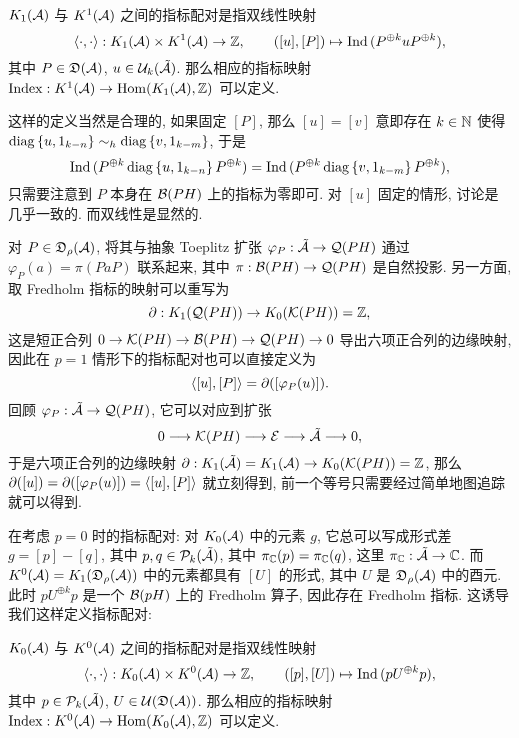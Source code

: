 \begin{Definition}[$ p=1 $ 的指标配对]
	$ K_1(\mathcal{A}) $ 与 $ K^1(\mathcal{A}) $ 之间的指标配对是指双线性映射
	\[
		\left\langle \cdot,\cdot \right\rangle : K_1(\mathcal{A})\times K^1(\mathcal{A})\to\mathbb{Z},\qquad ([u],[P])\mapsto\mathrm{Ind}\,(P^{\oplus k}uP^{\oplus k}),
	\]
	其中 $ P\in\mathfrak{D}(\mathcal{A}) $, $ u\in\mathcal{U}_k(\tilde{\mathcal{A}}) $. 那么相应的指标映射 $ \mathrm{Index} : K^1(\mathcal{A})\to\mathrm{Hom}(K_1(\mathcal{A}),\mathbb{Z}) $ 可以定义.
\end{Definition}

这样的定义当然是合理的, 如果固定 $ [P] $, 那么 $ [u]=[v] $ 意即存在 $ k\in\mathbb{N} $ 使得 $ \operatorname{diag}\left\{ u,1_{k-n} \right\}\sim_h\operatorname{diag}\left\{ v,1_{k-m} \right\} $, 于是
\[
	\mathrm{Ind}\,(P^{\oplus k}\operatorname{diag}\left\{ u,1_{k-n} \right\}P^{\oplus k})=\mathrm{Ind}\,(P^{\oplus k}\operatorname{diag}\left\{ v,1_{k-m} \right\}P^{\oplus k}),
\]
只需要注意到 $ P $ 本身在 $ \mathcal{B}(PH) $ 上的指标为零即可. 对 $ [u] $ 固定的情形, 讨论是几乎一致的. 而双线性是显然的.

对 $ P\in\mathfrak{D}_\rho(\mathcal{A}) $, 将其与抽象 Toeplitz 扩张 $ \varphi_P : \tilde{\mathcal{A}}\to\mathcal{Q}(PH) $ 通过 $ \varphi_P(a)=\pi(PaP) $ 联系起来, 其中 $ \pi : \mathcal{B}(PH)\to\mathcal{Q}(PH) $ 是自然投影. 另一方面, 取 Fredholm 指标的映射可以重写为
\[
	\partial : K_1(\mathcal{Q}(PH))\to K_0(\mathcal{K}(PH))=\mathbb{Z},
\]
这是短正合列 $ 0\to\mathcal{K}(PH)\to\mathcal{B}(PH)\to\mathcal{Q}(PH)\to 0 $ 导出六项正合列的边缘映射, 因此在 $ p=1 $ 情形下的指标配对也可以直接定义为
\[
	\left\langle [u],[P] \right\rangle=\partial([\varphi_P(u)]).
\]
回顾 $ \varphi_P : \tilde{\mathcal{A}}\to\mathcal{Q}(PH) $, 它可以对应到扩张
\[
	0\longrightarrow \mathcal{K}(PH)\longrightarrow\mathcal{E}\longrightarrow\tilde{\mathcal{A}}\longrightarrow 0,
\]
于是六项正合列的边缘映射 $ \partial : K_1(\tilde{\mathcal{A}})=K_1(\mathcal{A})\to K_0(\mathcal{K}(PH))=\mathbb{Z} $, 那么 $ \partial([u])=\partial([\varphi_P(u)])=\left\langle [u],[P] \right\rangle $ 就立刻得到, 前一个等号只需要经过简单地图追踪就可以得到.

在考虑 $ p=0 $ 时的指标配对: 对 $ K_0(\mathcal{A}) $ 中的元素 $ g $, 它总可以写成形式差 $ g=[p]-[q] $, 其中 $ p,q\in\mathcal{P}_k(\tilde{\mathcal{A}}) $, 其中 $ \pi_{\mathbb{C}}(p)=\pi_{\mathbb{C}}(q) $, 这里 $ \pi_{\mathbb{C}} : \tilde{\mathcal{A}}\to\mathbb{C} $. 而 $ K^0(\mathcal{A})=K_1(\mathfrak{D}_{\rho}(\mathcal{A})) $ 中的元素都具有 $ [U] $ 的形式, 其中 $ U $ 是 $ \mathfrak{D}_{\rho}(\mathcal{A}) $ 中的酉元. 此时 $ pU^{\oplus k}p $ 是一个 $ \mathcal{B}(pH) $ 上的 Fredholm 算子, 因此存在 Fredholm 指标. 这诱导我们这样定义指标配对:

\begin{Definition}[$ p=0 $ 时的指标配对]
	$ K_0(\mathcal{A}) $ 与 $ K^0(\mathcal{A}) $ 之间的指标配对是指双线性映射
	\[
		\left\langle \cdot,\cdot \right\rangle : K_0(\mathcal{A})\times K^0(\mathcal{A})\to\mathbb{Z},\qquad ([p],[U])\mapsto\mathrm{Ind}\,(pU^{\oplus k}p),
	\]
	其中 $ p\in\mathcal{P}_k(\tilde{\mathcal{A}}) $, $ U\in\mathcal{U}(\mathfrak{D}(\mathcal{A})) $. 那么相应的指标映射 $ \mathrm{Index} : K^0(\mathcal{A})\to\mathrm{Hom}(K_0(\mathcal{A}),\mathbb{Z}) $ 可以定义.
\end{Definition}

